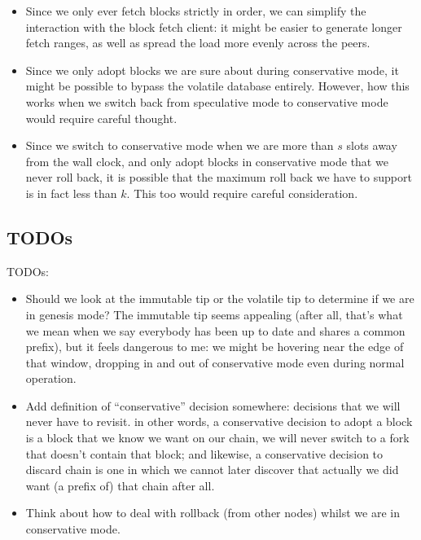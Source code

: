 \begin{itemize}
\item Since we only ever fetch blocks strictly in order, we can simplify
the interaction with the block fetch client: it might be easier to generate
longer fetch ranges, as well as spread the load more evenly across the peers.

\item Since we only adopt blocks we are sure about during conservative mode,
it might be possible to bypass the volatile database entirely. However,
how this works when we switch back from speculative mode to conservative mode
would require careful thought.

\item Since we switch to conservative mode when we are more than $s$ slots away
from the wall clock, and only adopt blocks in conservative mode that we never
roll back, it is possible that the maximum roll back we have to support
is in fact less than $k$. This too would require careful consideration.

\end{itemize}

\subsection{TODOs}

TODOs:

\begin{itemize}
\item Should we look at the immutable tip or the volatile tip to determine if we
are in genesis mode? The immutable tip seems appealing (after all, that's what
we mean when we say everybody has been up to date and shares a common prefix),
but it feels dangerous to me: we might be hovering near the edge of that window,
dropping in and out of conservative mode even during normal operation.
\item Add definition of ``conservative'' decision somewhere:
decisions that we will never have to revisit. in other words, a conservative
decision to adopt a block is a block that we know we want on our chain, we will
never switch to a fork that doesn't contain that block; and likewise, a
conservative decision to discard chain is one in which we cannot later discover
that actually we did want (a prefix of) that chain after all.
\item Think about how to deal with rollback (from other nodes) whilst we are
in conservative mode.
\end{itemize}
